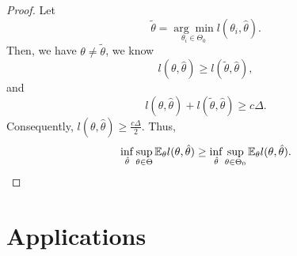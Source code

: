 \begin{proof}
	Let
	\begin{equation*}
		\tilde{\theta}=\underset{\theta_{i}\in\Theta_{0}}{\arg\min}l(\theta_{i},\hat{\theta}).
	\end{equation*}
	Then, we have \(\theta\neq\tilde{\theta}\), we know
	\begin{equation*}
		l(\theta,\hat{\theta})\geq l(\tilde{\theta},\hat{\theta}),
	\end{equation*}
	and
	\begin{equation*}
		l(\theta,\hat{\theta})+l(\tilde{\theta},\hat{\theta})\geq c\Delta.
	\end{equation*}
	Consequently, \(l(\theta,\hat{\theta})\geq\frac{c\Delta}{2}\). Thus,
	\begin{equation*}
		\inf_{\hat{\theta}}\sup_{\theta\in\Theta}\mathbb{E}_{\theta}l(\theta,\hat{\theta})\geq\inf_{\hat{\theta}}\sup_{\theta\in\Theta_{0}}\mathbb{E}_{\theta}l(\theta,\hat{\theta}).
	\end{equation*}
\end{proof}

\section{Applications}

